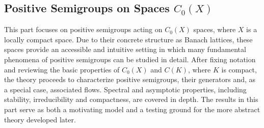 \begin{partbacktext}
\part{Positive Semigroups on Spaces \texorpdfstring{$C_{0}(X)$}{C₀(X)}}
This part focuses on positive semigroups acting on $C_{0}(X)$ spaces, where $X$ is a locally compact space.
Due to their concrete structure as Banach lattices, these spaces provide an accessible and intuitive setting in which many fundamental phenomena of positive semigroups can be studied in detail.
After fixing notation and reviewing the basic properties of $C_{0}(X)$ and $C(K)$, where $K$ is compact, the theory proceeds to characterize positive semigroups, their generators and, as a special case, associated flows.
Spectral and asymptotic properties, including stability, irreducibility and compactness, are covered in depth.
The results in this part serve as both a motivating model and a testing ground for the more abstract theory developed later.
\end{partbacktext}
